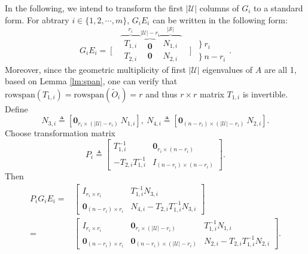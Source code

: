 \documentclass[journal]{IEEEtran}
\newcommand{\Uc}{{\mathcal{U}}}
\newcommand{\Sc}{{\mathcal{S}}}
\newcommand{\Oi}{{\tilde{O}_i}}
\newcommand{\rs}{\text{rowspan}}
\begin{document}
	In the following, we intend to transform the first $|\Uc|$ columns of $G_i$ to a standard form. 
	For abtrary $i\in\{1,2,\cdots,m\}$, $G_i E_i$ can be written in the following form:
	\begin{equation}\label{eq:structure_Gi}
		G_i E_i =
		\left[
		\begin{array}{c}
			{} \\ {}
		\end{array}
		\right.
		\overbrace{
			\begin{array}{c}
				T_{1,i} \\
				T_{2,i}
			\end{array}
		}^{r_i}
		\overbrace{
			\begin{array}{c}
				\mathbf{0} \\
				\mathbf{0}
			\end{array}
		}^{|\Uc|-r_i}
		\overbrace{
			\begin{array}{c}
				N_{1,i} \\
				N_{2,i}
			\end{array}
		}^{|\Sc|}
		\left.
		\begin{array}{c}
			{} \\ {}
		\end{array}
		\right]
		\begin{array}{l}
			\left. \right\} r_i \\
			\left. \right\} n-r_i
		\end{array} .
	\end{equation}
	Moreover, since the geometric multiplicity of first $|\Uc|$ eigenvalues of $A$ are all 1, based on Lemma \ref{lm:span}, one can verify that $\rs(T_{1,i})=\rs(\Oi)=r$ and thus $r\times r$ matrix $T_{1,i}$ is invertible.
	Define 
	\begin{equation*}
		N_{3,i}\triangleq [\mathbf{0}_{r_i \times (|\Uc|-r_i)}\ N_{1,i}], \
		N_{4,i}\triangleq [\mathbf{0}_{(n-r_i) \times (|\Uc|-r_i)}\ N_{2,i}] .
	\end{equation*}
	Choose transformation matrix
	\begin{equation}\label{eq:defP}
		P_i\triangleq 
		\begin{bmatrix}
			T^{-1}_{1,i} & \mathbf{0}_{r_i \times (n-r_i)} \\
			-T_{2,i}T^{-1}_{1,i} & I_{(n-r_i) \times (n-r_i)}
		\end{bmatrix}.
	\end{equation}
	Then 
	\begin{align*}
		P_i G_i E_i = &
		\begin{bmatrix}
			I_{r_i \times r_i} & T^{-1}_{1,i} N_{3,i} \\
			\mathbf{0}_{(n-r_i) \times r_i} & N_{4,i}-T_{2,i} T^{-1}_{1,i} N_{3,i}
		\end{bmatrix}\\
		=&
		\begin{bmatrix}
			I_{r_i \times r_i} & \mathbf{0}_{r_i \times (|\Uc|-r_i)}  & T^{-1}_{1,i} N_{1,i} \\
			\mathbf{0}_{(n-r_i) \times r_i} & \mathbf{0}_{(n-r_i) \times (|\Uc|-r_i)} & N_{2,i}-T_{2,i} T^{-1}_{1,i} N_{2,i}
		\end{bmatrix}.
	\end{align*}
\end{document}

